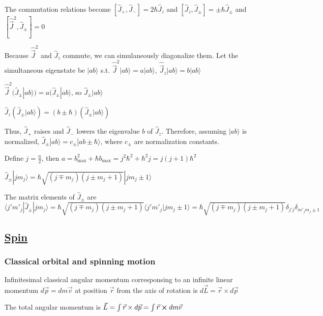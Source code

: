 The commutation relations become $[\widehat{J}_{+}, \widehat{J}_{-}] = 2 \hbar \widehat{J}_z$ and $[\widehat{J}_z, \widehat{J}_{\pm}] = \pm \hbar \widehat{J}_{\pm}$ and $[\widehat{\vec{J}}^2, \widehat{J}_{\pm}] = 0$

Because $\widehat{\vec{J}}^2$ and $\widehat{J}_z$ commute, we can simulaneously diagonalize them. Let the simultaneous eigenstate be $|ab\rangle$ s.t. $\widehat{\vec{J}}^2 | ab \rangle  = a | ab \rangle$, $\widehat{\vec{J}}_z | ab \rangle = b | ab \rangle$

$\widehat{\vec{J}}^2 ( \widehat{J}_{\pm} | ab \rangle) = a(\widehat{J}_{\pm} | ab \rangle$, so $\widehat{J}_{\pm} | ab \rangle$

$\widehat{J}_z(\widehat{J}_\pm |ab\rangle) = (b \pm \hbar) (\widehat{J}_{\pm} | ab \rangle)$

Thus, $\widehat{J}_{+}$ raises and $\widehat{J}_{-}$ lowers the eigenvalue $b$ of $\widehat{J}_z$. Therefore, assuming $|ab \rangle$ is normalized, $\widehat{J}_{\pm} | ab \rangle = c_{\pm} | ab \pm \hbar \rangle$, where $c_{\pm}$ are normalization constants.

Define $j = \frac{n}{2}$, then $a = b_{\textrm{max}}^2 + \hbar b_{\textrm{max}} = j^2 \hbar^2 + \hbar^2 j = j(j+1) \hbar^2$

$\widehat{J}_{\pm} | j m_j \rangle = \hbar \sqrt{(j \mp m_j)(j \pm m_j + 1)} | j m_j \pm 1 \rangle$

The matrix elements of $\widehat{J}_{\pm}$ are $\langle j' m'_j | \widehat{J}_{\pm} | j m_j \rangle = \hbar \sqrt{(j \mp m_j) (j \pm m_j + 1)} \langle j' m'_j | j m_j \pm 1 \rangle = \hbar \sqrt{(j \mp m_j)(j \pm m_j + 1)} \delta_{j' j} \delta_{m'_j m_j \pm 1}$

\subsection{\underline{Spin}}

\subsubsection{Classical orbital and spinning motion}

Infinitesimal classical angular momentum corresponsing to an infinite linear momentum $d \vec{p} = d m \vec{v}$ at position $\vec{r}$ from the axis of rotation is $d \vec{L} = \vec{r} \times d \vec{p}$

The total angular momentum is $\vec{L} = \int \vec{r} \times d \vec{p} = \int \vec{r} \cross d m \vec{v}$

